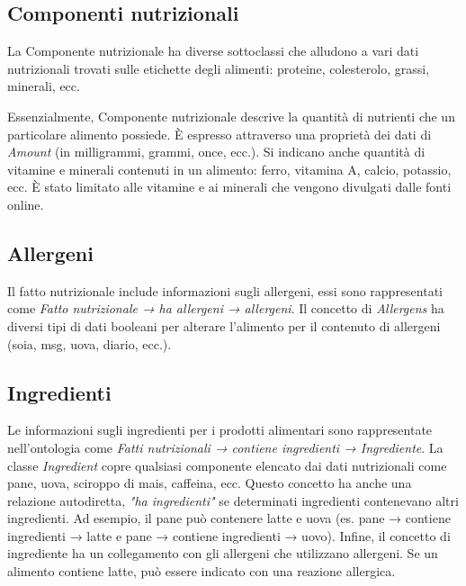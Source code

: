 \subsection{Componenti nutrizionali}
La Componente nutrizionale ha diverse sottoclassi che alludono a vari dati nutrizionali trovati sulle etichette degli alimenti: proteine, colesterolo, grassi, minerali, ecc. 

Essenzialmente, Componente nutrizionale descrive la quantità di nutrienti che un particolare alimento possiede. È espresso attraverso una proprietà dei dati di \emph{Amount} (in milligrammi, grammi, once, ecc.). 
Si indicano anche quantità di vitamine e minerali contenuti in un alimento: ferro, vitamina A, calcio, potassio, ecc. È stato limitato alle vitamine e ai minerali che vengono divulgati dalle fonti online.

\subsection{Allergeni}
Il fatto nutrizionale include informazioni sugli allergeni, essi sono rappresentati come \emph{Fatto nutrizionale → ha allergeni → allergeni}. Il concetto di \emph{Allergens} ha diversi tipi di dati booleani per alterare l'alimento per il contenuto di allergeni (soia, msg, uova, diario, ecc.).

\subsection{Ingredienti}
Le informazioni sugli ingredienti per i prodotti alimentari sono rappresentate nell'ontologia come \emph{Fatti nutrizionali → contiene ingredienti → Ingrediente}. La classe \emph{Ingredient} copre qualsiasi componente elencato dai dati nutrizionali come pane, uova, sciroppo di mais, caffeina, ecc. 
Questo concetto ha anche una relazione autodiretta, \emph{"ha ingredienti"} se determinati ingredienti contenevano altri ingredienti. Ad esempio, il pane può contenere latte e uova (es. pane → contiene ingredienti → latte e pane → contiene ingredienti → uovo). 
Infine, il concetto di ingrediente ha un collegamento con gli allergeni che utilizzano allergeni. Se un alimento contiene latte, può essere indicato con una reazione allergica.

